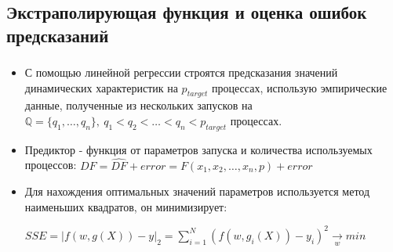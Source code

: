 \documentclass[unicode, t, 11pt]{beamer}%
\begin{document}
		\subsection{Экстраполирующая функция и оценка ошибок предсказаний}
			\begin{frame}
				\frametitle{\insertsection}
					\framesubtitle{\insertsubsection}
					\begin{itemize}[label = \(\bullet\)]
						\item С помощью линейной регрессии строятся предсказания значений динамических характеристик на \(p_{target}\) процессах, использую эмпирические данные, полученные из нескольких запусков на \(\mathbb{Q} = \{q_1,\ldots, q_n\},\ q_1 < q_2 < \ldots < q_n < p_{target}\) процессах.
						\item Предиктор - функция от параметров запуска и количества используемых процессов: \(\label{main_formula}DF = \hat{DF} + error = F(x_1, x_2, \ldots, x_n, p) + error\)
						\item Для нахождения оптимальных значений параметров используется метод наименьших квадратов, он минимизирует:

						{\small\(SSE = |f(w, g(X)) - y|_2 = \sum_{i = 1}^{N}{(f(w, g_i(X)) - y_i)^2 \xrightarrow[w]{} min}\)}
					\end{itemize}
			\end{frame}
\end{document}
